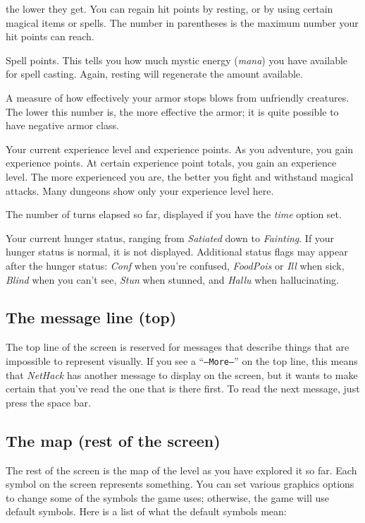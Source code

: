the lower they get.  You can regain hit points by resting, or by using
certain magical items or spells.  The number in parentheses is the maximum
number your hit points can reach.
\item[\bb{Power}]
Spell points.  This tells you how much mystic energy ({\it mana\/})
you have available for spell casting.  Again, resting will regenerate the
amount available.
\item[\bb{Armor Class}]
A measure of how effectively your armor stops blows from unfriendly
creatures.  The lower this number is, the more effective the armor; it
is quite possible to have negative armor class.
\item[\bb{Experience}]
Your current experience level and experience points.  As you
adventure, you gain experience points.  At certain experience point
totals, you gain an experience level.  The more experienced you are,
the better you fight and withstand magical attacks.  Many dungeons
show only your experience level here.
\item[\bb{Time}]
The number of turns elapsed so far, displayed if you have the
{\it time\/} option set.
\item[\bb{Hunger Status}]
Your current hunger status, ranging from %
{\it Satiated\/} down to {\it Fainting}.  If your hunger status is normal,
it is not displayed.
Additional status flags may appear after the hunger status:
{\it Conf\/} when you're confused, {\it FoodPois\/} or {\it Ill\/}
when sick, {\it Blind\/}
when you can't see, {\it Stun\/} when stunned, and {\it Hallu\/} when
hallucinating.
\elist

\subsection*{The message line (top)}

The top line of the screen is reserved for messages that describe
things that are impossible to represent visually.  If you see a
``{\tt --More--}'' on the top line, this means that {\it NetHack\/} has
another message to display on the screen, but it wants to make certain
that you've read the one that is there first.  To read the next message,
just press the space bar.

\subsection*{The map (rest of the screen)}

The rest of the screen is the map of the level as you have explored it
so far.  Each symbol on the screen represents something.  You can set
various graphics
options to change some of the symbols the game uses; otherwise, the
game will use default symbols.  Here is a list of what the default
symbols mean:

